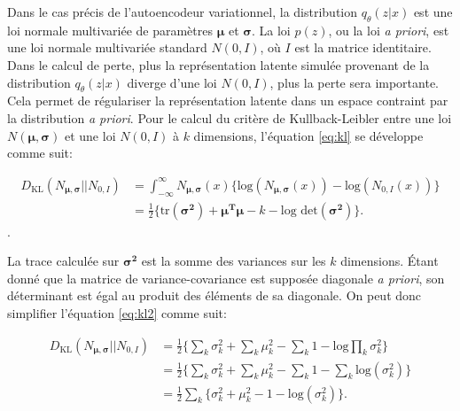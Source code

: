 Dans le cas précis de l'autoencodeur variationnel, la distribution $q_{\theta}(z|x)$ est une loi normale multivariée de paramètres $\boldsymbol \mu$ et $\boldsymbol \sigma$. La loi $p(z)$, ou la loi \textit{a priori}, est une loi normale multivariée standard $N(0,I)$, où $I$ est la matrice identitaire. Dans le calcul de perte, plus la représentation latente simulée provenant de la distribution $q_{\theta}(z|x)$ diverge d'une loi $N(0, I)$, plus la perte sera importante. Cela permet de régulariser la représentation latente dans un espace contraint par la distribution \textit{a priori}. Pour le calcul du critère de Kullback-Leibler entre une loi $N(\boldsymbol \mu, \boldsymbol \sigma)$ et une loi $N(0, I)$ à $k$ dimensions, l'équation \ref{eq:kl} se développe comme suit:

\begin{equation}  \label{eq:kl2}
	\begin{aligned}
	D_{\text{KL}}(N_{\boldsymbol \mu, \boldsymbol \sigma} || N_{0,I}) &= \int_{-\infty}^{\infty} N_{\boldsymbol \mu, \boldsymbol \sigma}(x) \big\{\text{log}(N_{\boldsymbol \mu,\boldsymbol \sigma}(x)) - \text{log}(N_{0,I}(x))\big\} \\
		&= \frac{1}{2}\big\{\text{tr}(\boldsymbol{\sigma^2}) + \boldsymbol{\mu^T} \boldsymbol{\mu} - k - \text{log det}(\boldsymbol{\sigma^2})\big \}.
 	\end{aligned}
\end{equation}.

La trace calculée sur $\boldsymbol{\sigma^2}$ est la somme des variances sur les $k$ dimensions. Étant donné que la matrice de variance-covariance est supposée diagonale \textit{a priori}, son déterminant est égal au produit des éléments de sa diagonale. On peut donc simplifier l'équation \ref{eq:kl2} comme suit:

\begin{equation}  \label{eq:kl3}
\begin{aligned}
D_{\text{KL}}(N_{\boldsymbol \mu, \boldsymbol \sigma} || N_{0,I}) &=  \frac{1}{2}\Big\{\sum_k \sigma_{k}^2+ \sum_{k}\mu_{k}^2 - \sum_{k} 1 - \text{log} \prod_{k}\sigma_{k}^2\Big \} \\
&=\frac{1}{2}\Big\{\sum_k \sigma_{k}^2+ \sum_{k}\mu_{k}^2 - \sum_{k} 1 - \sum_{k} \text{log} (\sigma_{k}^2)\Big \} \\
&=\frac{1}{2} \sum_{k}\Big\{\sigma_{k}^2 + \mu_{k}^2 - 1 - \text{log}(\sigma_{k}^2)\Big\}.
\end{aligned}
\end{equation}

